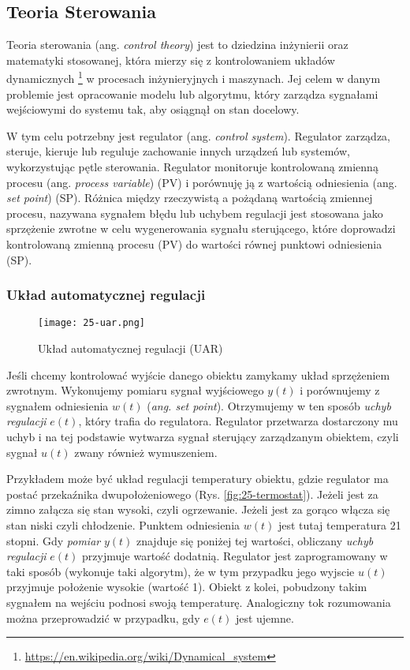 \subsection{Teoria Sterowania}

Teoria sterowania (ang. \textit{control theory}) jest to dziedzina inżynierii oraz matematyki stosowanej, która mierzy się z kontrolowaniem układów dynamicznych \footnote{\url{https://en.wikipedia.org/wiki/Dynamical_system}} w procesach inżynieryjnych i maszynach. Jej celem w danym problemie jest opracowanie modelu lub algorytmu, który zarządza sygnałami wejściowymi do systemu tak, aby osiągnął on stan docelowy. 

W tym celu potrzebny jest regulator (ang. \textit{control system}). Regulator zarządza, steruje, kieruje lub reguluje zachowanie innych urządzeń lub systemów, wykorzystując pętle sterowania. Regulator monitoruje kontrolowaną zmienną procesu (ang. \textit{process variable}) (PV) i porównuję ją z wartością odniesienia (ang. \textit{set point}) (SP). Różnica między rzeczywistą a pożądaną wartością zmiennej procesu, nazywana sygnałem błędu lub uchybem regulacji jest stosowana jako sprzężenie zwrotne w celu wygenerowania sygnału sterującego, które doprowadzi kontrolowaną zmienną procesu (PV) do wartości równej punktowi odniesienia (SP).

\subsubsection{Układ automatycznej regulacji}
\begin{figure}[!h]
    \centering \texttt{[image: 25-uar.png]}
    \caption{Układ automatycznej regulacji (UAR)}\label{fig:25-uar}
\end{figure}

Jeśli chcemy kontrolować wyjście danego obiektu zamykamy układ sprzężeniem zwrotnym. Wykonujemy pomiaru sygnał wyjściowego $y(t)$  i porównujemy z sygnałem odniesienia $w(t)$ (\textit{ang. set point}). Otrzymujemy w ten sposób \textit{uchyb regulacji} $e(t)$, który trafia do regulatora. Regulator przetwarza dostarczony mu uchyb i na tej podstawie wytwarza sygnał sterujący zarządzanym obiektem, czyli sygnał $u(t)$ zwany również wymuszeniem.

Przykładem może być układ regulacji temperatury obiektu, gdzie regulator ma postać przekaźnika dwupołożeniowego (Rys. \ref{fig:25-termostat}). Jeżeli jest za zimno załącza się stan wysoki, czyli ogrzewanie. Jeżeli jest za gorąco włącza się stan niski czyli chłodzenie. Punktem odniesienia $w(t)$ jest tutaj temperatura 21 stopni. Gdy \textit{pomiar} $y(t)$ znajduje się poniżej tej wartości, obliczany \textit{uchyb regulacji} $e(t)$ przyjmuje wartość dodatnią. Regulator jest zaprogramowany w taki sposób (wykonuje taki algorytm), że w tym przypadku jego wyjscie $u(t)$ przyjmuje położenie wysokie (wartość 1). Obiekt z kolei, pobudzony takim sygnałem na wejściu podnosi swoją temperaturę. Analogiczny tok rozumowania można przeprowadzić w przypadku, gdy $e(t)$ jest ujemne. 

